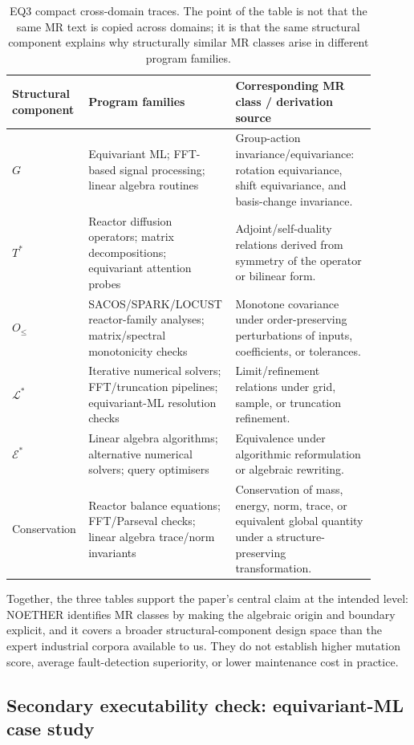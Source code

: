 \documentclass[acmsmall,screen,review]{acmart}
\begin{document}
\begin{table}[h]
\centering
\caption{EQ3 compact cross-domain traces. The point of the table is not that
the same MR text is copied across domains; it is that the same structural component
explains why structurally similar MR classes arise in different program
families.}
\label{tab:cross-domain-trace}
\small
\begin{tabular}{p{0.18\linewidth}p{0.34\linewidth}p{0.38\linewidth}}
\toprule
Structural component & Program families & Corresponding MR class / derivation source \\
\midrule
$G$ & Equivariant ML; FFT-based signal processing; linear algebra routines &
Group-action invariance/equivariance: rotation equivariance, shift equivariance,
and basis-change invariance. \\
$T^{*}$ & Reactor diffusion operators; matrix decompositions; equivariant
attention probes & Adjoint/self-duality relations derived from symmetry of the
operator or bilinear form. \\
$O_{\le}$ & SACOS/SPARK/LOCUST reactor-family analyses; matrix/spectral
monotonicity checks & Monotone covariance under order-preserving perturbations
of inputs, coefficients, or tolerances. \\
$\mathcal{L}^{*}$ & Iterative numerical solvers; FFT/truncation pipelines;
equivariant-ML resolution checks & Limit/refinement relations under grid,
sample, or truncation refinement. \\
$\mathcal{E}^{*}$ & Linear algebra algorithms; alternative numerical solvers;
query optimisers & Equivalence under algorithmic reformulation or algebraic
rewriting. \\
Conservation & Reactor balance equations; FFT/Parseval checks; linear algebra
trace/norm invariants & Conservation of mass, energy, norm, trace, or equivalent
global quantity under a structure-preserving transformation. \\
\bottomrule
\end{tabular}
\end{table}

Together, the three tables support the paper's central claim at the intended
level: NOETHER identifies MR classes by making the algebraic origin and boundary
explicit, and it covers a broader structural-component design space than the expert
industrial corpora available to us. They do not establish higher mutation score,
average fault-detection superiority, or lower maintenance cost in practice.

\subsection{Secondary executability check: equivariant-ML case study}
\label{subsec:case-study}
\end{document}

